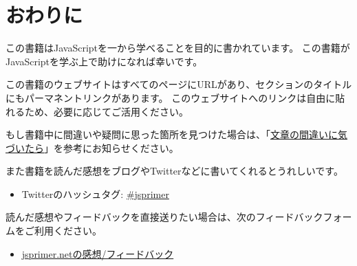 \hypertarget{outro}{%
\chapter*{おわりに}\label{outro}}

この書籍はJavaScriptを一から学べることを目的に書かれています。
この書籍がJavaScriptを学ぶ上で助けになれば幸いです。

この書籍のウェブサイトはすべてのページにURLがあり、セクションのタイトルにもパーマネントリンクがあります。
このウェブサイトへのリンクは自由に貼れるため、必要に応じてご活用ください。

もし書籍中に間違いや疑問に思った箇所を見つけた場合は、「\href{../intro/feedback/README.md}{文章の間違いに気づいたら}」を参考にお知らせください。

また書籍を読んだ感想をブログやTwitterなどに書いてくれるとうれしいです。

\begin{itemize}
\item
  Twitterのハッシュタグ:
  \href{https://twitter.com/search?f=realtime\&q=\%23jsprimer}{\#jsprimer}
\end{itemize}

読んだ感想やフィードバックを直接送りたい場合は、次のフィードバックフォームをご利用ください。

\begin{itemize}
\item
  \href{https://forms.gle/YAqr1oPBs1KShFSPA}{jsprimer.netの感想/フィードバック}
\end{itemize}
